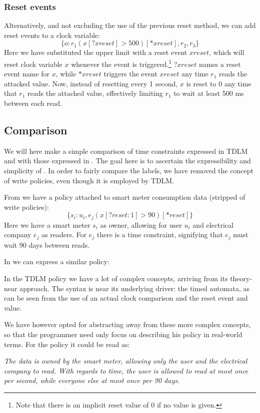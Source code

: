 \subsubsection{Reset events}
Alternatively, and not excluding the use of the previous reset method, we can add reset events to a clock variable:
  \[ \{ o : r_1(x[?xreset] > 500)[*xreset], r_2, r_3 \} \]
Here we have substituted the upper limit with a reset event $xreset$, which will reset clock variable $x$ whenever the event is triggered.\footnote{Note that there is an implicit reset value of 0 if no value is given.}
$?xreset$ names a reset event name for $x$, while $*xreset$ triggers the event $xreset$ any time $r_1$ reads the attacked value.
Now, instead of resetting every 1 second, $x$ is reset to 0 any time that $r_1$ reads the attached value, effectively limiting $r_1$ to wait at least 500 ms between each read.

\subsection{Comparison}
We will here make a simple comparison of time constraints expressed in TDLM and with those expressed in \thelang.
The goal here is to ascertain the expressibility and simplicity of \thelang.
In order to fairly compare the labels, we have removed the concept of write policies, even though it is employed by TDLM.

From \cite{pedersen2015} we have a policy attached to smart meter consumption data (stripped of write policies):
\[ \{s_i : u_i, e_j (x[?reset : 1] > 90)[*reset] \} \]
Here we have a smart meter $s_i$ as owner, allowing for user $u_i$ and electrical company $e_j$ as readers.
For $e_j$ there is a time constraint, signifying that $e_j$ must wait 90 days between reads.

In \thelang{} we can express a similar policy:
\begin{center}
\end{center}

In the TDLM policy we have a lot of complex concepts, arriving from its theory-near approach.
The syntax is near its underlying driver: the timed automata, as can be seen from the use of an actual clock comparison and the reset event and value.

We have however opted for abstracting away from these more complex concepts, so that the programmer need only focus on describing his policy in real-world terms.
For the \thelang{} policy it could be read as:
\begin{center}
\textit{The data is owned by the smart meter, allowing only the user and the electrical company to read. With regards to time, the user is allowed to read at most once per second, while everyone else at most once per 90 days.}
\end{center}
